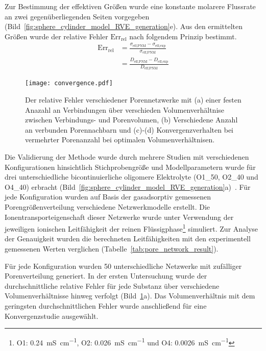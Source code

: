 Zur Bestimmung der effektiven Größen wurde eine konstante molarere Flussrate an zwei gegenüberliegenden Seiten vorgegeben (Bild~\ref{fig:sphere_cylinder_model_RVE_generation}e). Aus den ermittelten Größen wurde der relative Fehler $\text{Err}_{\text{rel}}$ nach folgendem Prinzip bestimmt.
\begin{align}
    \text{Err}_{\text{rel}} &= \frac{\sigma_{\text{eff,PNM}} - \sigma_{\text{eff,exp}}}{\sigma_{\text{eff,PNM}}}\\
    &= \frac{D_{\text{eff,PNM}} - D_{\text{eff,exp}}}{D_{\text{eff,PNM}}}
\end{align}

\begin{figure}[!h]
        \center
		\texttt{[image: convergence.pdf]}
		\caption{\label{fig:sphere_cylinder_model_convergence}Der relative Fehler verschiedener Porennetzwerke mit (a) einer festen Anazahl an Verbindungen über verschieden Volumenverhältnise zwischen Verbindungs- und Porenvolumen, (b) Verschiedene Anzahl an verbunden Porennachbarn und (c)-(d) Konvergenzverhalten bei vermehrter Porenanzahl bei optimalen Volumenverhältnisen.
        }
\end{figure}



Die Validierung der Methode wurde durch mehrere Studien mit verschiedenen Konfigurationen hinsichtlich Stichprobengröße und Modellparametern wurde für drei unterschiedliche bicontinuierliche oligomere Elektrolyte (O1\_50, O2\_40 und O4\_40) erbracht (Bild~\ref{fig:sphere_cylinder_model_RVE_generation}a)~\cite{Emilsson2023}. Für jede Konfiguration wurden auf Basis der gasadsorptiv gemessenen Porengrößenverteilung verschiedene Netzwerkmodelle erstellt. Die Ionentransporteigenschaft dieser Netzwerke wurde unter Verwendung der jeweiligen ionischen Leitfähigkeit der reinen Flüssigphase\footnote{O1: \SI{0,24}{\milli\siemens\per\centi\meter}, O2: \SI{0,026}{\milli\siemens\per\centi\meter} und O4: \SI{0,0026}{\milli\siemens\per\centi\meter}} simuliert.
Zur Analyse der Genauigkeit wurden die berechneten Leitfähigkeiten mit den experimentell gemessenen Werten verglichen (Tabelle~\ref{tab:pore_network_result}).

Für jede Konfiguration wurden 50 unterschiedliche Netzwerke mit zufälliger Porenverteilung generiert. In der ersten Untersuchung wurde der durchschnittliche relative Fehler für jede Substanz über verschiedene Volumenverhältnisse hinweg verfolgt (Bild~\ref{fig:sphere_cylinder_model_convergence}a). Das Volumenverhältnis mit dem geringsten durchschnittlichen Fehler wurde anschließend für eine Konvergenzstudie ausgewählt.

